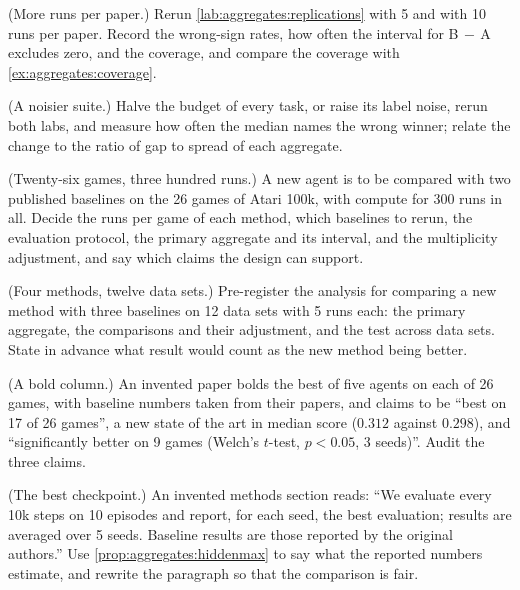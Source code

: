 \begin{refsection}
\begin{exercises}
\item \labwork (More runs per paper.) Rerun \cref{lab:aggregates:replications} with 5 and with 10 runs per paper. Record the wrong-sign rates, how often the interval for B$\,-\,$A excludes zero, and the coverage, and compare the coverage with \cref{ex:aggregates:coverage}.\label{ex:aggregates:moreruns}

\item \labwork (A noisier suite.) Halve the budget of every task, or raise its label noise, rerun both labs, and measure how often the median names the wrong winner; relate the change to the ratio of gap to spread of each aggregate.\label{ex:aggregates:noisier}

\item \design (Twenty-six games, three hundred runs.) A new agent is to be compared with two published baselines on the 26 games of Atari 100k, with compute for 300 runs in all. Decide the runs per game of each method, which baselines to rerun, the evaluation protocol, the primary aggregate and its interval, and the multiplicity adjustment, and say which claims the design can support.\label{ex:aggregates:design26}

\item \design (Four methods, twelve data sets.) Pre-register the analysis for comparing a new method with three baselines on 12 data sets with 5 runs each: the primary aggregate, the comparisons and their adjustment, and the test across data sets. State in advance what result would count as the new method being better.\label{ex:aggregates:prereg}

\item \critique (A bold column.) An invented paper bolds the best of five agents on each of 26 games, with baseline numbers taken from their papers, and claims to be ``best on 17 of 26 games'', a new state of the art in median score ($0.312$ against $0.298$), and ``significantly better on 9 games (Welch's $t$-test, $p<0.05$, 3 seeds)''. Audit the three claims.\label{ex:aggregates:bold}

\item \critique (The best checkpoint.) An invented methods section reads: ``We evaluate every 10k steps on 10 episodes and report, for each seed, the best evaluation; results are averaged over 5 seeds. Baseline results are those reported by the original authors.'' Use \cref{prop:aggregates:hiddenmax} to say what the reported numbers estimate, and rewrite the paragraph so that the comparison is fair.\label{ex:aggregates:checkpoint}


\end{exercises}
\end{refsection}
